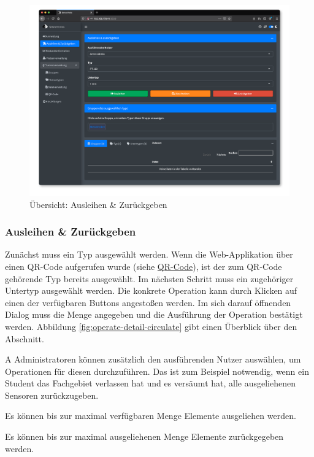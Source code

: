 \documentclass[
]{article}
\begin{document}
\begin{figure}
\centering
\includegraphics{./img/operate_overview.png}
\caption{\label{fig:operate-overview}Übersicht: Ausleihen \& Zurückgeben}
\end{figure}

\hypertarget{ausleihen-zuruxfcckgeben}{%
\subsubsection{Ausleihen \& Zurückgeben}\label{ausleihen-zuruxfcckgeben}}

Zunächst muss ein Typ ausgewählt werden. Wenn die Web-Applikation über einen QR-Code aufgerufen wurde (siehe \protect\hyperlink{qrcode}{QR-Code}), ist der zum QR-Code gehörende Typ bereits ausgewählt. Im nächsten Schritt muss ein zugehöriger Untertyp ausgewählt werden. Die konkrete Operation kann durch Klicken auf einen der verfügbaren Buttons angestoßen werden. Im sich darauf öffnenden Dialog muss die Menge angegeben und die Ausführung der Operation bestätigt werden. Abbildung \ref{fig:operate-detail-circulate} gibt einen Überblick über den Abschnitt.

A Administratoren können zusätzlich den ausführenden Nutzer auswählen, um Operationen für diesen durchzuführen. Das ist zum Beispiel notwendig, wenn ein Student das Fachgebiet verlassen hat und es versäumt hat, alle ausgeliehenen Sensoren zurückzugeben.

Es können bis zur maximal verfügbaren Menge Elemente ausgeliehen werden.

Es können bis zur maximal ausgeliehenen Menge Elemente zurückgegeben werden.
\end{document}
